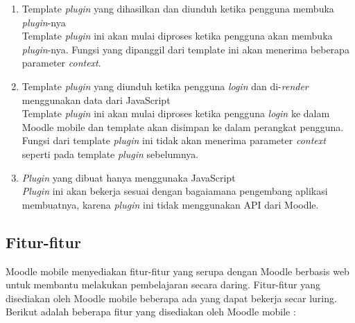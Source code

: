 	\begin{enumerate}
	\item Template \textit{plugin} yang dihasilkan dan diunduh ketika pengguna membuka \textit{plugin}-nya\\
		Template \textit{plugin} ini akan mulai diproses ketika pengguna akan membuka \textit{plugin}-nya. Fungsi yang dipanggil dari template ini akan menerima beberapa parameter \textit{context}.
		
	\item Template \textit{plugin} yang diunduh ketika pengguna \textit{login} dan di-\textit{render} menggunakan data dari JavaScript \\
		Template \textit{plugin} ini  akan mulai diproses ketika pengguna \textit{login} ke dalam Moodle mobile dan template akan disimpan ke dalam perangkat pengguna. Fungsi dari template \textit{plugin} ini tidak akan menerima parameter \textit{context} seperti pada template \textit{plugin} sebelumnya.
	\item \textit{Plugin} yang dibuat hanya menggunaka JavaScript \\
		\textit{Plugin} ini akan bekerja sesuai dengan bagaiamana pengembang aplikasi membuatnya, karena \textit{plugin} ini tidak menggunakan API dari Moodle.
	\end{enumerate}

\subsection{Fitur-fitur}
Moodle mobile menyediakan fitur-fitur yang serupa dengan Moodle berbasis web untuk membantu melakukan pembelajaran secara daring. Fitur-fitur yang disediakan oleh Moodle mobile beberapa ada yang dapat bekerja secar luring. Berikut adalah beberapa fitur yang disediakan oleh Moodle mobile \cite{Moodlemobile:features}:

